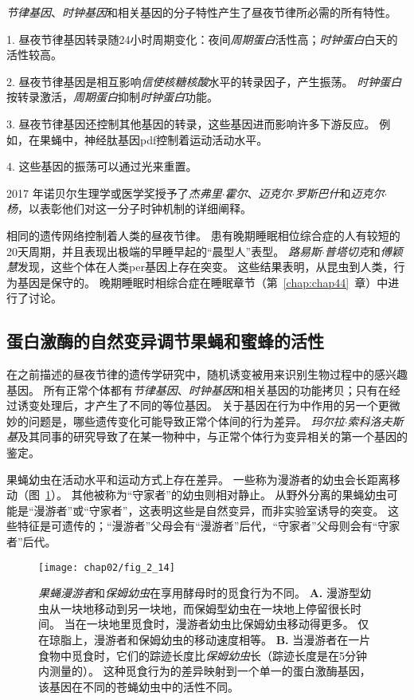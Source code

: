 \textit{节律基因}、\textit{时钟基因}和相关基因的分子特性产生了昼夜节律所必需的所有特性。

1. 昼夜节律基因转录随24小时周期变化：夜间\textit{周期蛋白}活性高；\textit{时钟蛋白}白天的活性较高。


2. 昼夜节律基因是相互影响\textit{信使核糖核酸}水平的转录因子，产生振荡。
\textit{时钟蛋白}按转录激活，\textit{周期蛋白}抑制\textit{时钟蛋白}功能。


3. 昼夜节律基因还控制其他基因的转录，这些基因进而影响许多下游反应。
例如，在果蝇中，神经肽基因pdf控制着运动活动水平。


4. 这些基因的振荡可以通过光来重置。



2017 年诺贝尔生理学或医学奖授予了\textit{杰弗里$\cdot$霍尔}、\textit{迈克尔$\cdot$罗斯巴什}和\textit{迈克尔$\cdot$杨}，以表彰他们对这一分子时钟机制的详细阐释。


相同的遗传网络控制着人类的昼夜节律。
患有晚期睡眠相位综合症的人有较短的20天周期，并且表现出极端的早睡早起的“晨型人”表型。
\textit{路易斯$\cdot$普塔切克}和\textit{傅颖慧}发现，这些个体在人类per基因上存在突变。
这些结果表明，从昆虫到人类，行为基因是保守的。
晚期睡眠时相综合症在睡眠章节（第~\ref{chap:chap44}~章）中进行了讨论。



\subsection{蛋白激酶的自然变异调节果蝇和蜜蜂的活性}

在之前描述的昼夜节律的遗传学研究中，随机诱变被用来识别生物过程中的感兴趣基因。
所有正常个体都有\textit{节律基因}、\textit{时钟基因}和相关基因的功能拷贝；只有在经过诱变处理后，才产生了不同的等位基因。
关于基因在行为中作用的另一个更微妙的问题是，哪些遗传变化可能导致正常个体间的行为差异。
\textit{玛尔拉$\cdot$索科洛夫斯基}及其同事的研究导致了在某一物种中，与正常个体行为变异相关的第一个基因的鉴定。




果蝇幼虫在活动水平和运动方式上存在差异。
一些称为漫游者的幼虫会长距离移动（图~\ref{fig:2_14}）。
其他被称为“守家者”的幼虫则相对静止。
从野外分离的果蝇幼虫可能是“漫游者”或“守家者”，这表明这些是自然变异，而非实验室诱导的突变。
这些特征是可遗传的；“漫游者”父母会有“漫游者”后代，“守家者”父母则会有“守家者”后代。


\begin{figure}[htbp]
	\centering
	\texttt{[image: chap02/fig\_2\_14]}
	\caption{\textit{果蝇漫游者}和\textit{保姆幼虫}在享用酵母时的觅食行为不同\cite{sokolowski2001drosophila}。
		\textbf{A.} 漫游型幼虫从一块地移动到另一块地，而保姆型幼虫在一块地上停留很长时间。
		当在一块地里觅食时，漫游者幼虫比保姆幼虫移动得更多。
		仅在琼脂上，漫游者和保姆幼虫的移动速度相等。
		\textbf{B.} 当漫游者在一片食物中觅食时，它们的踪迹长度比\textit{保姆幼虫}长（踪迹长度是在5分钟内测量的）。
		这种觅食行为的差异映射到一个单一的蛋白激酶基因，该基因在不同的苍蝇幼虫中的活性不同。}
	\label{fig:2_14}
\end{figure}


